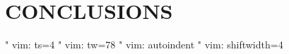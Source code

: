 \section{CONCLUSIONS}


\cite{1}
 







" vim: ts=4
" vim: tw=78
" vim: autoindent
" vim: shiftwidth=4
